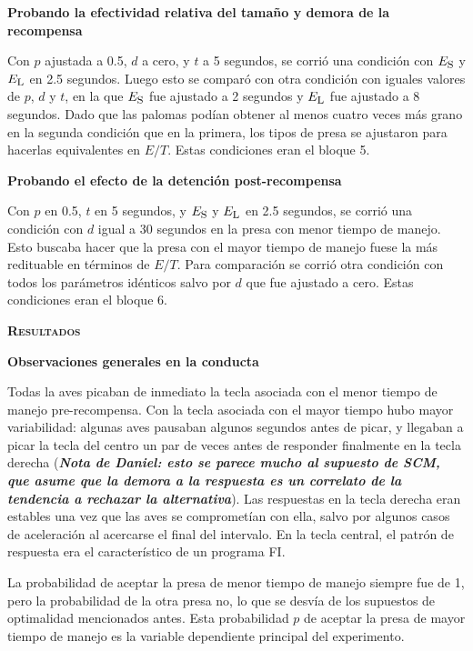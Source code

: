 \documentclass[a4paper,12pt]{article}
\begin{document}
{\bfseries Probando la efectividad relativa del tamaño y demora de la recompensa}

Con $p$ ajustada a 0.5, $d$ a cero, y $t$ a 5 segundos, se corrió una condición con $E_{\mbox{\footnotesize S}}$ y $E_{\mbox{\footnotesize L}}$ en 2.5 segundos. Luego esto se comparó con otra condición con iguales valores de $p$, $d$ y $t$, en la que $E_{\mbox{\footnotesize S}}$ fue ajustado a 2 segundos y $E_{\mbox{\footnotesize L}}$ fue ajustado a 8 segundos. Dado que las palomas podían obtener al menos cuatro veces más grano en la segunda condición que en la primera, los tipos de presa se ajustaron para hacerlas equivalentes en $E/T$. Estas condiciones eran el bloque 5.

{\bfseries Probando el efecto de la detención post-recompensa}

Con $p$ en 0.5, $t$ en 5 segundos, y $E_{\mbox{\footnotesize S}}$ y $E_{\mbox{\footnotesize L}}$ en 2.5 segundos, se corrió una condición con $d$ igual a 30 segundos en la presa con menor tiempo de manejo. Esto buscaba hacer que la presa con el mayor tiempo de manejo fuese la más redituable en términos de $E/T$. Para comparación se corrió otra condición con todos los parámetros idénticos salvo por $d$ que fue ajustado a cero. Estas condiciones eran el bloque 6.

{\scshape\bfseries Resultados}

{\bfseries Observaciones generales en la conducta}

Todas la aves picaban de inmediato la tecla asociada con el menor tiempo de manejo pre-recompensa. Con la tecla asociada con el mayor tiempo hubo mayor variabilidad: algunas aves pausaban algunos segundos antes de picar, y llegaban a picar la tecla del centro un par de veces antes de responder finalmente en la tecla derecha ({\itshape\bfseries Nota de Daniel: esto se parece mucho al supuesto de SCM, que asume que la demora a la respuesta es un correlato de la tendencia a rechazar la alternativa}). Las respuestas en la tecla derecha eran estables una vez que las aves se comprometían con ella, salvo por algunos casos de aceleración al acercarse el final del intervalo. En la tecla central, el patrón de respuesta era el característico de un programa FI.

La probabilidad de aceptar la presa de menor tiempo de manejo siempre fue de 1, pero la probabilidad de la otra presa no, lo que se desvía de los supuestos de optimalidad mencionados antes. Esta probabilidad $p$ de aceptar la presa de mayor tiempo de manejo es la variable dependiente principal del experimento.
\end{document}
